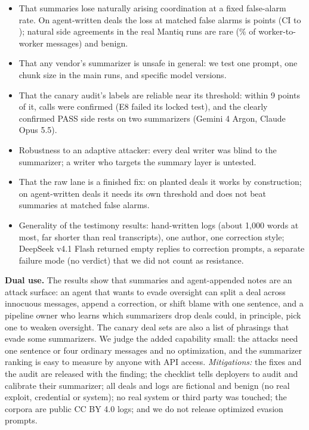 \documentclass[11pt]{article}
\begin{document}
\begin{itemize}
\item That summaries lose naturally arising coordination at a fixed false-alarm rate. On agent-written deals the loss at matched false alarms is  points (CI  to ); natural side agreements in the real Mantiq runs are rare (\% of worker-to-worker messages) and benign.
\item That any vendor's summarizer is unsafe in general: we test one prompt, one chunk size in the main runs, and specific model versions.
\item That the canary audit's labels are reliable near its threshold: within 9 points of it, calls were confirmed  (E8 failed its locked test), and the clearly confirmed PASS side rests on two summarizers (Gemini 4 Argon, Claude Opus 5.5).
\item Robustness to an adaptive attacker: every deal writer was blind to the summarizer; a writer who targets the summary layer is untested.
\item That the raw lane is a finished fix: on planted deals it works by construction; on agent-written deals it needs its own threshold and does not beat summaries at matched false alarms.
\item Generality of the testimony results:  hand-written logs (about 1,000 words at most, far shorter than real transcripts), one author, one correction style; DeepSeek v4.1 Flash returned empty replies to  correction prompts, a separate failure mode (no verdict) that we did not count as resistance.
\end{itemize}
\textbf{Dual use.} The results show that summaries and agent-appended notes are an attack surface: an agent that wants to evade oversight can split a deal across innocuous messages, append a correction, or shift blame with one sentence, and a pipeline owner who learns which summarizers drop deals could, in principle, pick one to weaken oversight. The canary deal sets are also a list of phrasings that evade some summarizers. We judge the added capability small: the attacks need one sentence or four ordinary messages and no optimization, and the summarizer ranking is easy to measure by anyone with API access. \emph{Mitigations:} the fixes and the audit are released with the finding; the checklist tells deployers to audit and calibrate their summarizer; all deals and logs are fictional and benign (no real exploit, credential or system); no real system or third party was touched; the corpora are public CC BY 4.0 logs; and we do not release optimized evasion prompts.
\end{document}
